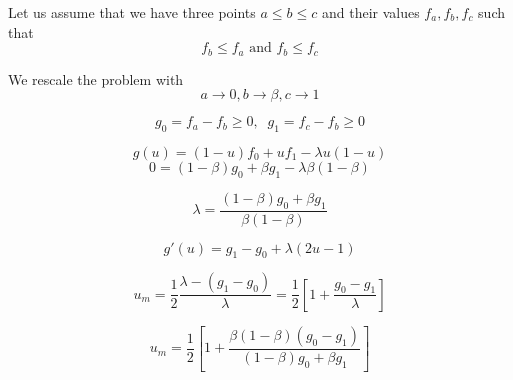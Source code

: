 \documentclass[aps,12pt]{revtex4}
\begin{document}
Let us assume that we have three points $a\leq b \leq c$ and their values
$f_a,f_b,f_c$ such that
\begin{equation}
	f_b \leq f_a \text{ and } f_b \leq f_c
\end{equation} 

We rescale the problem with
$$
	a \to 0, b \to \beta, c \to 1
$$	

$$
	g_0 = f_a - f_b \geq 0, \;\; g_1 = f_c - f_b \geq 0
$$

$$
	g(u) = (1-u) f_0 + u f_1 - \lambda u(1-u)
$$
$$
	0 = (1-\beta) g_0 + \beta g_1 - \lambda \beta(1-\beta)
$$

$$
	\lambda = \dfrac{(1-\beta) g_0 + \beta g_1 }{\beta(1-\beta)}
$$

$$
	g'(u) = g_1-g_0 + \lambda (2u-1)
$$

$$
	u_m = \dfrac{1}{2} \dfrac{\lambda - (g_1-g_0)}{\lambda} = \dfrac{1}{2}\left[ 1 + \dfrac{g_0-g_1}{\lambda} \right]
$$

$$
	u_m = \frac{1}{2} \left[ 1 + \dfrac{ \beta(1-\beta) (g_0-g_1) }{ (1-\beta) g_0 + \beta g_1 } \right]
$$
\end{document}
